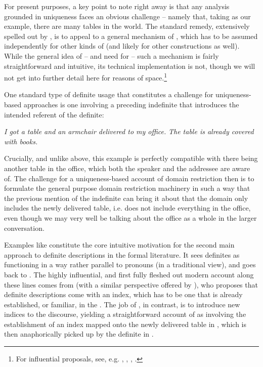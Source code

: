 \documentclass[output=paper
,modfonts
,nonflat]{langscibook}
\begin{document}
For present purposes, a key point to note right away is
that any analysis grounded in uniqueness faces an obvious challenge --
namely that, taking  as our example, there are many tables
in the world. The standard remedy, extensively spelled
out by \citet{Neale1990}, is to appeal to a general mechanism of
, which has to be assumed independently for other kinds of
 (and likely for other constructions as well). While the
general idea of -- and need for -- such a mechanism is fairly
straightforward and intuitive,
its technical implementation is not, though we will not get into
further detail here for reasons of space.\footnote{For influential
proposals, see, e.g. \citet{Westerstahl1984}, \citet{Fintel1994}, \citet{StanleySzabo2000}, \citet{Elbourne2013}.}

One standard type of definite usage that constitutes a challenge for
uniqueness-based approaches is one involving a preceding indefinite
that introduces the intended referent of the definite:

\begin{exe}
\ex \label{ex:schwarz:2} 
\begin{xlist}
\ex\label{ex:schwarz:2a}
	\textit{I got {a table} and an armchair delivered to my office.}
\ex\label{ex:schwarz:2b}
	\textit{{The table} is already covered with books.} 
\end{xlist}
\end{exe}

Crucially, and unlike  above, this example is perfectly
compatible with there being another table in the office, which both the
speaker and the addressee are aware of. The challenge for a
uniqueness-based account of domain restriction then is to formulate the
general purpose domain restriction machinery in such a way that the
previous mention of the indefinite can bring it about that the domain
only includes the newly delivered table, i.e. does not include
everything in the office, even though we may very well be talking about
the office as a whole in the larger conversation.

Examples like  constitute the core intuitive
motivation for the second main approach to definite descriptions in
the formal literature. It sees definites as functioning in a way
rather parallel to pronouns (in a traditional view), and goes back to \citet{Christophersen1939}. The highly influential,
and first fully fleshed out modern account along these lines comes
from \citet{Heim1982} (with a similar perspective offered by
\citealt{Kamp1981}), who proposes that definite descriptions come with
an index, which has to be one that is already established, or familiar, in the
. The job of , in contrast, is to introduce new
indices to the discourse, yielding a straightforward account of
 as involving the establishment of an index mapped onto
the newly delivered table in , which is then
anaphorically picked up by the definite in . 
\end{document}
